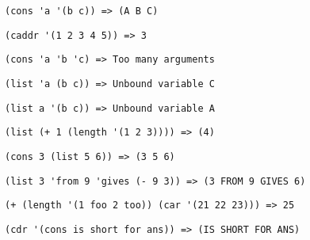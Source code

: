 \problem \hfill

\begin{lstlisting}
(cons 'a '(b c)) => (A B C) 
\end{lstlisting}


\problem \hfill

\begin{lstlisting}
(caddr '(1 2 3 4 5)) => 3
\end{lstlisting}


\problem \hfill

\begin{lstlisting}
(cons 'a 'b 'c) => Too many arguments
\end{lstlisting}


\problem \hfill

\begin{lstlisting}
(list 'a (b c)) => Unbound variable C
\end{lstlisting}


\problem \hfill

\begin{lstlisting}
(list a '(b c)) => Unbound variable A
\end{lstlisting}


\problem \hfill

\begin{lstlisting}
(list (+ 1 (length '(1 2 3)))) => (4) 
\end{lstlisting}


\problem \hfill

\begin{lstlisting}
(cons 3 (list 5 6)) => (3 5 6)
\end{lstlisting}


\problem \hfill

\begin{lstlisting}
(list 3 'from 9 'gives (- 9 3)) => (3 FROM 9 GIVES 6) 
\end{lstlisting}


\problem \hfill

\begin{lstlisting}
(+ (length '(1 foo 2 too)) (car '(21 22 23))) => 25
\end{lstlisting}


\problem \hfill

\begin{lstlisting}
(cdr '(cons is short for ans)) => (IS SHORT FOR ANS)
\end{lstlisting}


\problem \hfill

